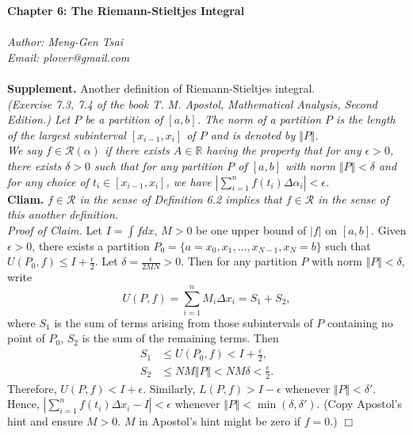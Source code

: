 \documentclass{article}
\begin{document}
\textbf{\Large Chapter 6: The Riemann-Stieltjes Integral} \\\\



\emph{Author: Meng-Gen Tsai} \\
\emph{Email: plover@gmail.com} \\\\



\textbf{Supplement.} Another definition of Riemann-Stieltjes integral. \\
\emph{(Exercise 7.3, 7.4 of the book
T. M. Apostol, Mathematical Analysis, Second Edition.)
Let $P$ be a partition of $[a, b]$.
The norm of a partition $P$ is the length of the largest subinterval $[x_{i-1}, x_i]$
of $P$ and is denoted by $\Vert P \Vert$.} \\

\emph{We say $f \in \mathscr{R}(\alpha)$
if there exists $A \in \mathbb{R}$ having the property that
for any $\epsilon > 0$, there exists $\delta > 0$ such that
for any partition $P$ of $[a, b]$ with norm $\Vert P \Vert < \delta$
and for any choice of $t_i \in [x_{i-1}, x_i]$,
we have $|\sum_{i = 1}^{n} f(t_i) \Delta \alpha_i| < \epsilon$.} \\

\textbf{Cliam.}
\emph{$f \in \mathscr{R}$ in the sense of Definition 6.2
implies that
$f \in \mathscr{R}$ in the sense of this another definition.} \\
\emph{Proof of Claim.}
Let $I = \int f dx$, $M > 0$ be one upper bound of $|f|$ on $[a, b]$.
Given $\epsilon > 0$, there exists a partition
$P_0 = \{a = x_0, x_1, ..., x_{N-1}, x_N = b \}$
such that
$U(P_0, f) \leq I + \frac{\epsilon}{2}$.
Let $\delta = \frac{\epsilon}{2MN} > 0$.
Then for any partition $P$ with norm $\Vert P \Vert < \delta$, write
$$U(P, f) = \sum_{i = 1}^{n} M_i \Delta x_i = S_1 + S_2,$$
where
$S_1$ is the sum of terms arising from those subintervals of $P$ containing no point of $P_0$,
$S_2$ is the sum of the remaining terms.
Then
\begin{align*}
S_1 &\leq U(P_0, f) < I + \frac{\epsilon}{2}, \\
S_2 &\leq NM \Vert P \Vert < NM \delta < \frac{\epsilon}{2}.
\end{align*}
Therefore, $U(P, f) < I + \epsilon$.
Similarly, $L(P, f) > I - \epsilon$ whenever $\Vert P \Vert < \delta'$.
Hence, $|\sum_{i = 1}^{n} f(t_i) \Delta x_i - I| < \epsilon$
whenever $\Vert P \Vert < \min(\delta, \delta')$.
(Copy Apostol's hint and ensure $M > 0$. $M$ in Apostol's hint might be zero if $f = 0$.)
$\Box$ \\
\end{document}
